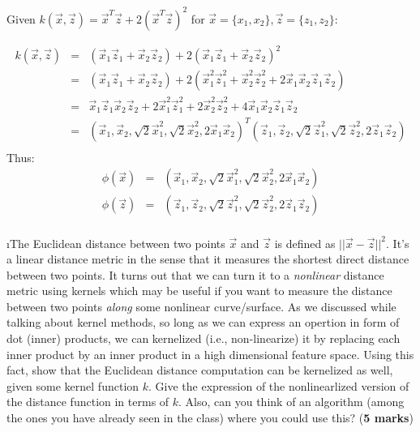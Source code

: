 \documentclass[fleqn]{article}
\begin{document}
\begin{solution}

Given $k(\vec{x}, \vec{z}) = \vec{x}^T\vec{z} + 2(\vec{x}^T\vec{z})^2$ for $\vec{x} = \{x_1, x_2\}, \vec{z} = \{z_1, z_2\}$:

\begin{eqnarray*}
k(\vec{x}, \vec{z}) & = & (\vec{x}_1 \vec{z}_1 + \vec{x}_2 \vec{z}_2) + 2(\vec{x}_1 \vec{z}_1 + \vec{x}_2 \vec{z}_2)^2 \\
& = & (\vec{x}_1 \vec{z}_1 + \vec{x}_2 \vec{z}_2) + 2(\vec{x}^2_1 \vec{z}^2_1 + \vec{x}^2_2 \vec{z}^2_2 + 2 \vec{x}_1 \vec{x}_2 \vec{z}_1 \vec{z}_2) \\
& = & \vec{x}_1 \vec{z}_1 \vec{x}_2 \vec{z}_2 + 2 \vec{x}^2_1 \vec{z}^2_1 + 2 \vec{x}^2_2 \vec{z}^2_2 + 4 \vec{x}_1 \vec{x}_2 \vec{z}_1 \vec{z}_2 \\
& = & (\vec{x}_1, \vec{x}_2, \sqrt{2} \vec{x}^2_1, \sqrt{2} \vec{x}^2_2, 2 \vec{x}_1 \vec{x}_2)^T (\vec{z}_1, \vec{z}_2, \sqrt{2} \vec{z}^2_1, \sqrt{2} \vec{z}^2_2, 2 \vec{z}_1 \vec{z}_2) \\
\end{eqnarray*}
Thus:
\begin{eqnarray*}
\phi(\vec{x}) & = & (\vec{x}_1, \vec{x}_2, \sqrt{2} \vec{x}^2_1, \sqrt{2} \vec{x}^2_2, 2 \vec{x}_1 \vec{x}_2) \\
\phi(\vec{z}) & = & (\vec{z}_1, \vec{z}_2, \sqrt{2} \vec{z}^2_1, \sqrt{2} \vec{z}^2_2, 2 \vec{z}_1 \vec{z}_2) \\
\end{eqnarray*}
\end{solution}

\i The Euclidean distance between two points $\vec{x}$ and $\vec{z}$ is 
defined as  $||\vec{x}-\vec{z}||^2$. It's a linear distance
metric in the sense that it measures the shortest direct distance between
two points. It turns out that we can turn it to a \textit{nonlinear} distance metric
using kernels which may be useful if you want to measure the distance between
two points \textit{along} some nonlinear curve/surface. As we discussed 
while talking about kernel methods, so long as we can express an opertion in 
form of dot (inner) products, we can kernelized (i.e., non-linearize) it by
replacing each inner product by an inner product in a high dimensional feature
space. Using this fact, show that the Euclidean distance computation can be 
kernelized as well, given some kernel function $k$. Give the expression
of the nonlinearlized version of the distance function in terms of $k$. 
Also, can you think of an algorithm (among the ones you have already seen in the
class) where you could use this? (\textbf{5 marks})
\end{document}
